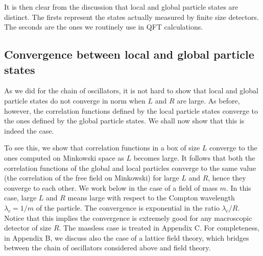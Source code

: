 \documentclass[10pt, nofootinbib]{revtex4}
\begin{document}
It is then clear from the discussion that local and global particle
states are distinct.  The firsts represent the states actually
measured by finite size detectors.  The seconds are the ones we
routinely use in QFT calculations.

\subsection{Convergence between local and global particle states}

As we did for the chain of oscillators, it is not hard to show that
local and global particle states do not converge in norm when $L$ and
$R$ are large.  As before, however, the correlation functions defined
by the local particle states converge to the ones defined by the
global particle states.  We shall now show that this is indeed the
case.

To see this, we show that correlation functions in a box of size $L$
converge to the ones computed on Minkowski space as $L$ becomes large. 
It follows that both the correlation functions of the global and local
particles converge to the same value (the correlation of the free
field on Minkowski) for large $L$ and $R$, hence they converge to each
other.  We work below in the case of a field of mass $m$.  In this
case, large $L$ and $R$ means large with respect to the Compton
wavelength $\lambda_{c}=1/m$ of the particle.  The convergence is
exponential in the ratio $\lambda_{c}/R$.  Notice that this implies
the convergence is extremely good for any macroscopic detector of size
$R$.  The massless case is treated in Appendix C. For completeness, in
Appendix B, we discuss also the case of a lattice field theory, which
bridges between the chain of oscillators considered above and field
theory.
\end{document}
